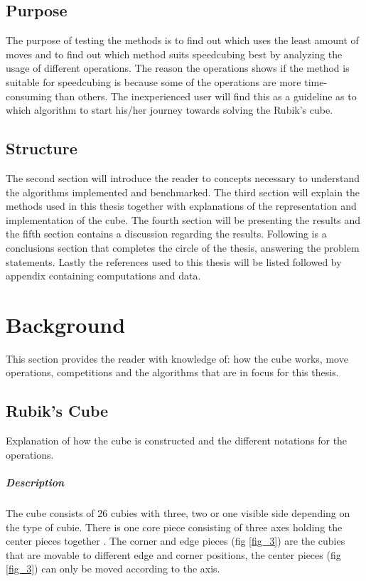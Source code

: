 \documentclass[a4paper,11pt]{kth-mag}
\begin{document}
\section{Purpose}
The purpose of testing the methods is to find out which uses the least amount of moves and to find out which method suits speedcubing best by analyzing the usage of different operations. The reason the operations shows if the method is suitable for speedcubing is because some of the operations are more time-consuming than others. The inexperienced user will find this as a guideline as to which algorithm to start his/her journey towards solving the Rubik’s cube.
\section{Structure}
The second section will introduce the reader to concepts necessary to understand the algorithms implemented and benchmarked. The third section will explain the methods used in this thesis together with explanations of the representation and implementation of the cube. The fourth section will be presenting the results and the fifth section contains a discussion regarding the results. Following is a conclusions section that completes the circle of the thesis, answering the problem statements. Lastly the references used to this thesis will be listed followed by appendix containing computations and data.  


\chapter{Background}
This section provides the reader with knowledge of: how the cube works, move operations, competitions and the algorithms that are in focus for this thesis.
\section{Rubik's Cube}
Explanation of how the cube is constructed and the different notations for the operations.
\paragraph{Description}
The cube consists of 26 cubies with three, two or one visible side depending on the type of cubie. There is one core piece consisting of three axes holding the center pieces together \cite{MadeHow}. 
  The corner and edge pieces (fig \ref{fig_3})  are the cubies that are movable to different edge and corner positions, the center pieces (fig \ref{fig_3}) can only be moved according to the axis.  
\end{document}
